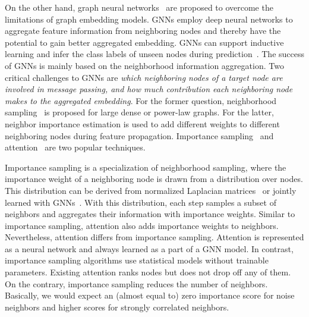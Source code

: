\documentclass[sigconf]{acmart}
\begin{document}
On the other hand, graph neural networks~\cite{kipf2016semi, hamilton2017inductive, velivckovic2017graph} are proposed to overcome the limitations of graph embedding models.
GNNs employ deep neural networks to aggregate feature information from neighboring nodes and thereby have the potential to gain better aggregated embedding.
GNNs can support inductive learning and infer the class labels of unseen nodes during prediction~\cite{hamilton2017inductive, velivckovic2017graph}.
The success of GNNs is mainly based on the neighborhood information aggregation.
Two critical challenges to GNNs are \textit{which neighboring nodes of a target node are involved in message passing, and how much contribution each neighboring node makes to the aggregated embedding}.
For the former question, neighborhood sampling~\cite{hamilton2017inductive, ying2018graph, chen2018fastgcn, huang2018adaptive, zou2019layer, ji2020accelerating} is proposed for large dense or power-law graphs.
For the latter, neighbor importance estimation is used to add different weights to different neighboring nodes during feature propagation.
Importance sampling~\cite{chen2018fastgcn, zou2019layer, ji2020accelerating} and attention~\cite{velivckovic2017graph,liu2019geniepath, wang2019heterogeneous, yun2019graph, hu2020heterogeneous} are two popular techniques.

Importance sampling is a specialization of neighborhood sampling, where the importance weight of a neighboring node is drawn from a distribution over nodes.
This distribution can be derived from normalized Laplacian matrices~\cite{chen2018fastgcn, zou2019layer} or jointly learned with GNNs~\cite{ji2020accelerating}.
With this distribution, each step samples a subset of neighbors and aggregates their information with importance weights.
Similar to importance sampling, attention also adds importance weights to neighbors.
Nevertheless, attention differs from importance sampling.
Attention is represented as a neural network and always learned as a part of a GNN model.
In contrast, importance sampling algorithms use statistical models without trainable parameters.
Existing attention ranks nodes but does not drop off any of them. On the contrary, importance sampling reduces the number of neighbors.
Basically, we would expect an (almost equal to) zero importance score for noise neighbors and higher scores for strongly correlated neighbors.
\end{document}
